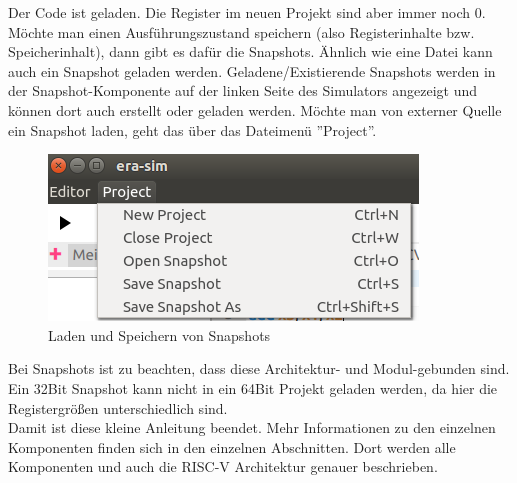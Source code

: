 Der Code ist geladen. Die Register im neuen Projekt sind aber immer noch 0.
Möchte man einen Ausführungszustand speichern (also Registerinhalte bzw.
Speicherinhalt), dann gibt es dafür die Snapshots. Ähnlich wie eine Datei kann
auch ein Snapshot geladen werden. Geladene/Existierende Snapshots werden in der
Snapshot-Komponente auf der linken Seite des Simulators angezeigt und können
dort auch erstellt oder geladen werden. Möchte man von externer Quelle ein
Snapshot laden, geht das über das Dateimenü ''Project''.
\begin{figure}[H]
	\centering
	\includegraphics[scale=1.0]{Images/first-steps-13.png}
	\caption{Laden und Speichern von Snapshots}
\end{figure}

Bei Snapshots ist zu beachten, dass diese Architektur- und Modul-gebunden sind.
Ein 32Bit Snapshot kann nicht in ein 64Bit Projekt geladen werden, da hier die
Registergrößen unterschiedlich sind.\\

Damit ist diese kleine Anleitung beendet. Mehr Informationen zu den einzelnen
Komponenten finden sich in den einzelnen Abschnitten. Dort werden alle
Komponenten und auch die RISC-V Architektur genauer beschrieben.
